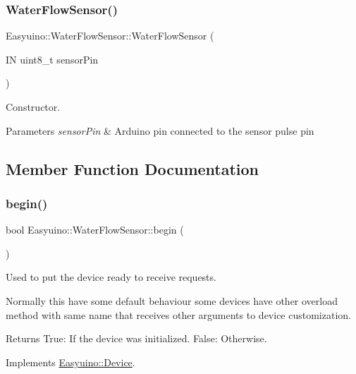 \subsubsection{\texorpdfstring{Water\+Flow\+Sensor()}{WaterFlowSensor()}}
{\footnotesize\ttfamily Easyuino\+::\+Water\+Flow\+Sensor\+::\+Water\+Flow\+Sensor (\begin{DoxyParamCaption}\item[{IN uint8\+\_\+t}]{sensor\+Pin }\end{DoxyParamCaption})}



Constructor. 


\begin{DoxyParams}{Parameters}
{\em sensor\+Pin} & Arduino pin connected to the sensor pulse pin \\
\hline
\end{DoxyParams}


\subsection{Member Function Documentation}
\mbox{\label{class_easyuino_1_1_water_flow_sensor_a55dcab6c527b1e1951a1fff69efdb763}} 
\subsubsection{\texorpdfstring{begin()}{begin()}}
{\footnotesize\ttfamily bool Easyuino\+::\+Water\+Flow\+Sensor\+::begin (\begin{DoxyParamCaption}{ }\end{DoxyParamCaption})\hspace{0.3cm}{\ttfamily [virtual]}}



Used to put the device ready to receive requests. 

Normally this have some default behaviour some devices have other overload method with same name that receives other arguments to device customization. \begin{DoxyReturn}{Returns}
True\+: If the device was initialized. False\+: Otherwise. 
\end{DoxyReturn}


Implements \hyperlink{class_easyuino_1_1_device_a2e7bb2fec849719a9d9432b57cdb72ba}{Easyuino\+::\+Device}.

